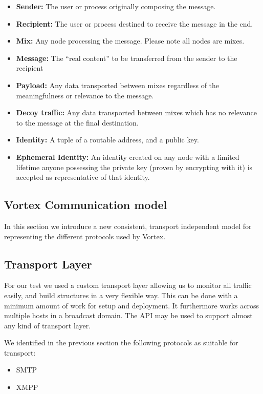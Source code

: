 \begin{itemize}
	\item \textbf{Sender:} The user or process originally composing the message.
	\item \textbf{Recipient:} The user or process destined to receive the message in the end.
	\item \textbf{Mix:} Any node processing the message. Please note all nodes are mixes.
	\item \textbf{Message:} The ``real content'' to be transferred from the sender to the recipient
	\item \textbf{Payload:} Any data transported between mixes regardless of the meaningfulness or relevance to the message.
	\item \textbf{Decoy traffic:} Any data transported between mixes which has no relevance to the message at the final destination.
	\item \textbf{Identity:} A tuple of a routable address, and a public key.
	\item \textbf{Ephemeral Identity:} An identity created on any node with a limited lifetime anyone possessing the private key (proven by encrypting with it) is accepted as representative of that identity.
\end{itemize}



\subsection{Vortex Communication model}
In this section we introduce a new consistent, transport independent model for representing the different protocols used by Vortex.


\subsection{Transport Layer}
For our test we used a custom transport layer allowing us to monitor all traffic easily, and build structures in a very flexible way. This can be done with a minimum amount of work for setup  and deployment. It furthermore works across multiple hosts in a broadcast domain. The API may be used to support almost any kind of transport layer.

We identified in the previous section the following protocols as suitable for transport:
\begin{itemize}
	\item SMTP
	\item XMPP
\end{itemize}

